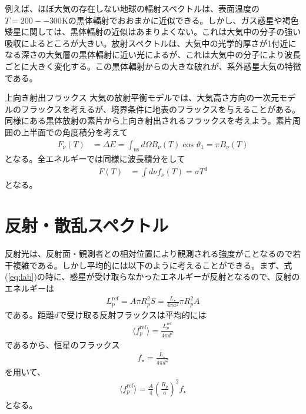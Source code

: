 例えば、ほぼ大気の存在しない地球の輻射スペクトルは、表面温度の$T=200--300$Kの黒体輻射でおおまかに近似できる。しかし、ガス惑星や褐色矮星に関しては、黒体輻射の近似はあまりよくない。これは大気中の分子の強い吸収によるところが大きい。放射スペクトルは、大気中の光学的厚さが1付近になる深さの大気層の黒体輻射に近い光によるが、これは大気中の分子により波長ごとに大きく変化する。この黒体輻射からの大きな破れが、系外惑星大気の特徴である。\\


\begin{itembox}{上向き射出フラックス}
\footnotesize
\color{gray}
大気の放射平衡モデルでは、大気高さ方向の一次元モデルのフラックスを考えるが、境界条件に地表のフラックスを与えることがある。同様にある黒体放射の素片から上向き射出されるフラックスを考えよう。素片周囲の上半面での角度積分を考えて
\begin{align}
\label{eq:defsurf}
F_\nu (T) &= \Delta E = \int_\mathrm{us} d \Omega B_\nu (T) \cos{\vartheta_1} = \pi B_\nu (T)
\end{align}
となる。全エネルギーでは同様に波長積分をして
\begin{align}
\label{eq:defsurflum}
F (T) &= \int d \nu f_\nu (T) = \sigma T^4 
\end{align}
となる。
\end{itembox}

\section{反射・散乱スペクトル}

反射光は、反射面・観測者との相対位置により観測される強度がことなるので若干複雑である。しかし平均的には以下のように考えることができる。まず、式(\ref{eq:lab})の時に、惑星が受け取らなかったエネルギーが反射となるので、反射のエネルギーは
\begin{align}
    L^\mathrm{ref}_p = A \pi R_p^2 S = \frac{L_\star}{4 \pi a^2} \pi R_p^2 A
\end{align}
である。距離$d$で受け取る反射フラックスは平均的には
\begin{align}
    \langle f_{p}^\mathrm{ref} \rangle = \frac{ L^\mathrm{ref}_p}{4 \pi d^2}
\end{align}
であるから、恒星のフラックス
\begin{align}
    f_\star = \frac{L_\star}{4 \pi d^2}
\end{align}
を用いて、
\begin{align}
    \langle f_{p}^\mathrm{ref} \rangle = \frac{A}{4} \left( \frac{R_p}{a} \right)^2 f_\star
\end{align}
となる。

